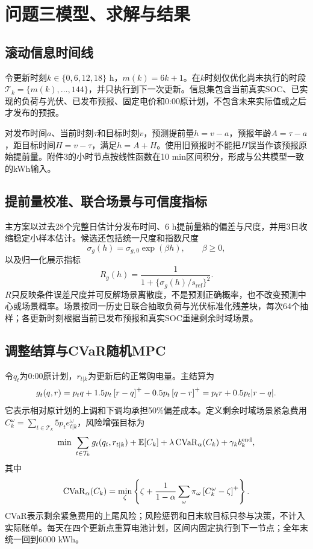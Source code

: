 \section{问题三模型、求解与结果}

\subsection{滚动信息时间线}

令更新时刻$k\in\{0,6,12,18\}$ h，$m(k)=6k+1$。在$k$时刻仅优化尚未执行的时段$\mathcal T_k=\{m(k),\ldots,144\}$，并只执行到下一次更新。信息集包含当前真实SOC、已实现的负荷与光伏、已发布预报、固定电价和0:00原计划，不包含未来实际值或之后才发布的预报。

对发布时间$a$、当前时刻$\tau$和目标时刻$v$，预测提前量$h=v-a$，预报年龄$A=\tau-a$，距目标时间$H=v-\tau$，满足$h=A+H$。使用旧预报时不能把$H$误当作该预报原始提前量。附件3的小时节点按线性函数在10 min区间积分，形成与公共模型一致的kWh输入。

\subsection{提前量校准、联合场景与可信度指标}

主方案以过去28个完整日估计分发布时间、6 h提前量箱的偏差与尺度，并用3日收缩稳定小样本估计。候选还包括统一尺度和指数尺度
\begin{equation}
 \sigma_g(h)=\sigma_{g,0}\exp(\beta h),\qquad \beta\ge0,
\end{equation}
以及归一化展示指标
\begin{equation}
 R_g(h)=\frac{1}{1+\{\sigma_g(h)/s_{\mathrm{ref}}\}^2}.
\end{equation}
$R$只反映条件误差尺度并可反解场景离散度，不是预测正确概率，也不改变预测中心或场景概率。场景按同一历史日联合抽取负荷与光伏标准化残差块，每次64个抽样；各更新时刻根据当前已发布预报和真实SOC重建剩余时域场景。

\subsection{调整结算与CVaR随机MPC}

令$q_t$为0:00原计划，$r_{t|k}$为更新后的正常购电量。主结算为
\begin{equation}
 g_t(q,r)=p_tq+1.5p_t\left[r-q\right]^+-0.5p_t\left[q-r\right]^+
 =p_tr+0.5p_t|r-q|.
\end{equation}
它表示相对原计划的上调和下调均承担50\%偏差成本。定义剩余时域场景紧急费用$C_k^\omega=\sum_{t\in\mathcal T_k}5p_te_{t|k}^\omega$，风险增强目标为
\begin{equation}
 \min\ \sum_{t\in\mathcal T_k}g_t(q_t,r_{t|k})+\mathbb E[C_k]
 +\lambda\operatorname{CVaR}_{\alpha}(C_k)+\gamma_k b_k^{\mathrm{end}},
\end{equation}
其中
\begin{equation}
 \operatorname{CVaR}_{\alpha}(C_k)=\min_{\zeta}\left\{\zeta+
 \frac{1}{1-\alpha}\sum_\omega\pi_\omega\left[C_k^\omega-\zeta\right]^+\right\}.
\end{equation}
CVaR表示剩余紧急费用的上尾风险\cite{rockafellar2000}；风险惩罚和日末软目标只参与决策，不计入实际账单。每天在四个更新点重算电池计划，区间内固定执行到下一节点；全年末统一回到6000 kWh。

